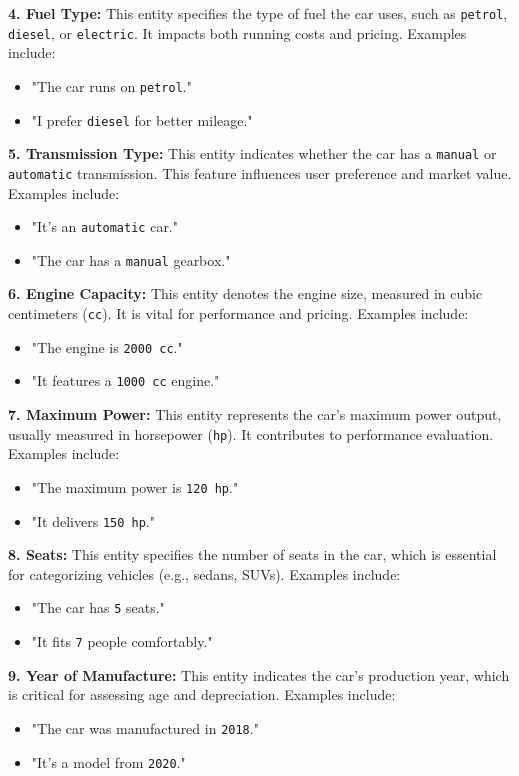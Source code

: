 \documentclass[a4paper,12pt]{article}
\begin{document}
\textbf{4. Fuel Type:} This entity specifies the type of fuel the car uses, such as \texttt{petrol}, \texttt{diesel}, or \texttt{electric}. It impacts both running costs and pricing. Examples include:
\begin{itemize}
	\item "The car runs on \texttt{petrol}."
	\item "I prefer \texttt{diesel} for better mileage."
\end{itemize}

\textbf{5. Transmission Type:} This entity indicates whether the car has a \texttt{manual} or \texttt{automatic} transmission. This feature influences user preference and market value. Examples include:
\begin{itemize}
	\item "It’s an \texttt{automatic} car."
	\item "The car has a \texttt{manual} gearbox."
\end{itemize}

\textbf{6. Engine Capacity:} This entity denotes the engine size, measured in cubic centimeters (\texttt{cc}). It is vital for performance and pricing. Examples include:
\begin{itemize}
	\item "The engine is \texttt{2000 cc}."
	\item "It features a \texttt{1000 cc} engine."
\end{itemize}

\textbf{7. Maximum Power:} This entity represents the car's maximum power output, usually measured in horsepower (\texttt{hp}). It contributes to performance evaluation. Examples include:
\begin{itemize}
	\item "The maximum power is \texttt{120 hp}."
	\item "It delivers \texttt{150 hp}."
\end{itemize}

\textbf{8. Seats:} This entity specifies the number of seats in the car, which is essential for categorizing vehicles (e.g., sedans, SUVs). Examples include:
\begin{itemize}
	\item "The car has \texttt{5} seats."
	\item "It fits \texttt{7} people comfortably."
\end{itemize}

\textbf{9. Year of Manufacture:} This entity indicates the car's production year, which is critical for assessing age and depreciation. Examples include:
\begin{itemize}
	\item "The car was manufactured in \texttt{2018}."
	\item "It’s a model from \texttt{2020}."
\end{itemize}
\end{document}
